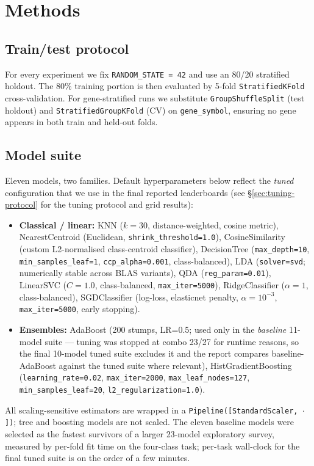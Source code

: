 \documentclass[11pt,a4paper]{article}
\begin{document}
\section{Methods}

\subsection{Train/test protocol}

For every experiment we fix \texttt{RANDOM\_STATE = 42} and use an 80/20 stratified
holdout. The 80\% training portion is then evaluated by 5-fold
\texttt{StratifiedKFold} cross-validation. For gene-stratified runs we substitute
\texttt{GroupShuffleSplit} (test holdout) and \texttt{StratifiedGroupKFold} (CV) on
\texttt{gene\_symbol}, ensuring no gene appears in both train and held-out folds.

\subsection{Model suite}
\label{sec:model-suite}

Eleven models, two families. Default hyperparameters below reflect the
\emph{tuned} configuration that we use in the final reported leaderboards
(see \S\ref{sec:tuning-protocol} for the tuning protocol and grid results):
\begin{itemize}[leftmargin=*]
    \item \textbf{Classical / linear:} KNN ($k=30$, distance-weighted, cosine
          metric), NearestCentroid (Euclidean, \texttt{shrink\_threshold=1.0}),
          CosineSimilarity (custom L2-normalised class-centroid classifier),
          DecisionTree (\texttt{max\_depth=10}, \texttt{min\_samples\_leaf=1},
          \texttt{ccp\_alpha=0.001}, class-balanced),
          LDA (\texttt{solver=svd}; numerically stable across BLAS variants),
          QDA (\texttt{reg\_param=0.01}), LinearSVC ($C=1.0$, class-balanced,
          \texttt{max\_iter=5000}), RidgeClassifier ($\alpha=1$, class-balanced),
          SGDClassifier (log-loss, elasticnet penalty, $\alpha=10^{-3}$,
          \texttt{max\_iter=5000}, early stopping).
    \item \textbf{Ensembles:} AdaBoost (200 stumps, LR=0.5; used only in the
          \emph{baseline} 11-model suite — tuning was stopped at combo 23/27
          for runtime reasons, so the final 10-model tuned suite excludes it
          and the report compares baseline-AdaBoost against the tuned suite
          where relevant), HistGradientBoosting (\texttt{learning\_rate=0.02},
          \texttt{max\_iter=2000}, \texttt{max\_leaf\_nodes=127},
          \texttt{min\_samples\_leaf=20}, \texttt{l2\_regularization=1.0}).
\end{itemize}
All scaling-sensitive estimators are wrapped in a
\texttt{Pipeline([StandardScaler, $\cdot$])}; tree and boosting models are not
scaled. The eleven baseline models were selected as the fastest survivors of a
larger 23-model exploratory survey, measured by per-fold fit time on the
four-class task; per-task wall-clock for the final tuned suite is on the order
of a few minutes.
\end{document}
